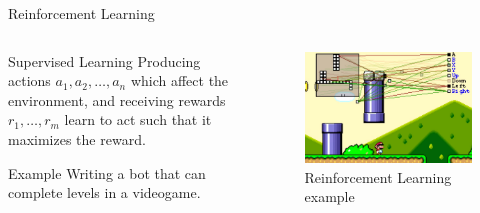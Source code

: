 \documentclass{beamer}
\begin{document}
    \begin{frame}{Reinforcement Learning}
        \begin{columns}
        \begin{column}{0.5\textwidth}
        \begin{block}{Supervised Learning}
        Producing actions $a_1,a_2,\dots,a_n$ which affect the environment, and receiving rewards $r_1,\dots,r_m$ learn to act such that it maximizes the reward. 
	    \end{block}

        \begin{exampleblock}{Example}
        Writing a bot that can complete levels in a videogame.
        \end{exampleblock}
        \end{column}
        \begin{column}{0.5\textwidth}
            
        \begin{figure}
        \centering
            \includegraphics[width=\textwidth]{images/presentation/mario.jpg}
            \caption{Reinforcement Learning example}
        \end{figure}

        \end{column}
        \end{columns}
    \end{frame}
\end{document}

